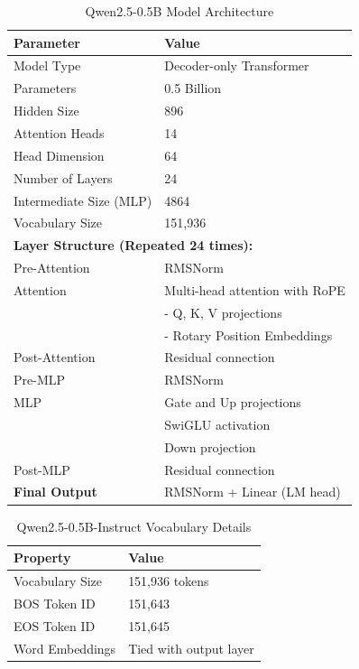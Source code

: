 \documentclass{article}
\begin{document}
\begin{table}[ht]
\centering
\begin{tabular}{ll}
\hline
\textbf{Parameter} & \textbf{Value} \\
\hline
Model Type & Decoder-only Transformer \\
Parameters & 0.5 Billion \\
Hidden Size & 896 \\
Attention Heads & 14 \\
Head Dimension & 64 \\
Number of Layers & 24 \\
Intermediate Size (MLP) & 4864 \\
Vocabulary Size & 151,936 \\
\hline
\multicolumn{2}{l}{\textbf{Layer Structure (Repeated 24 times):}} \\
\hline
Pre-Attention & RMSNorm \\
Attention & Multi-head attention with RoPE \\
& \quad - Q, K, V projections \\
& \quad - Rotary Position Embeddings \\
Post-Attention & Residual connection \\
Pre-MLP & RMSNorm \\
MLP & Gate and Up projections \\
& SwiGLU activation \\
& Down projection \\
Post-MLP & Residual connection \\
\hline
\textbf{Final Output} & RMSNorm + Linear (LM head) \\
\hline
\end{tabular}
\caption{Qwen2.5-0.5B Model Architecture}
\label{tab:qwen25-overview} 
\end{table}


\begin{table}[H]
\centering
\begin{tabular}{@{}ll@{}}
\hline
\textbf{Property} & \textbf{Value} \\
\hline
Vocabulary Size & 151,936 tokens \\
BOS Token ID & 151,643 \\
EOS Token ID & 151,645 \\
Word Embeddings & Tied with output layer \\
\hline
\end{tabular}
\caption{Qwen2.5-0.5B-Instruct Vocabulary Details}
\label{tab:qwen25-vocab}
\end{table}
\end{document}
